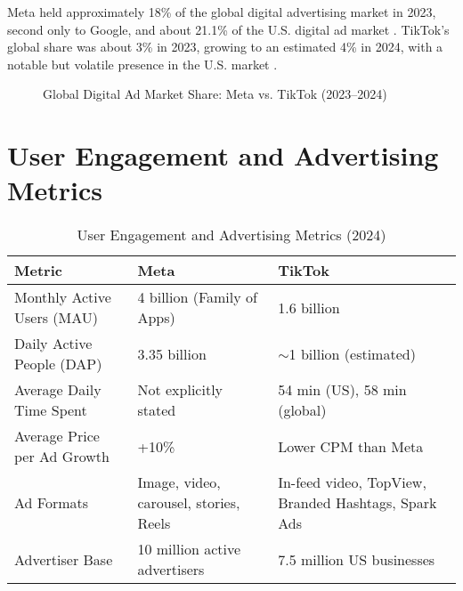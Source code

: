 \documentclass{article}
\begin{document}
Meta held approximately 18\% of the global digital advertising market in 2023, second only to Google, and about 21.1\% of the U.S. digital ad market \cite{statista_global_share,statista_us_share}. TikTok's global share was about 3\% in 2023, growing to an estimated 4\% in 2024, with a notable but volatile presence in the U.S. market \cite{tiktok_roirevolution,martech_meta_tiktok}.

\begin{figure}[ht]
\centering
{}
\caption{Global Digital Ad Market Share: Meta vs. TikTok (2023--2024)}
\label{fig:market_share_line}
\end{figure}

\section{User Engagement and Advertising Metrics}

\begin{table}[ht]
\centering
\caption{User Engagement and Advertising Metrics (2024)}
\label{tab:user_metrics}
\begin{tabularx}{\textwidth}{l X X}
\toprule
Metric & Meta & TikTok \\
\midrule
Monthly Active Users (MAU) & 4 billion (Family of Apps) & 1.6 billion \\
Daily Active People (DAP) & 3.35 billion & $\sim$1 billion (estimated) \\
Average Daily Time Spent & Not explicitly stated & 54 min (US), 58 min (global) \\
Average Price per Ad Growth & +10\% & Lower CPM than Meta \\
Ad Formats & Image, video, carousel, stories, Reels & In-feed video, TopView, Branded Hashtags, Spark Ads \\
Advertiser Base & 10 million active advertisers & 7.5 million US businesses \\
\bottomrule
\end{tabularx}
\end{table}
\end{document}
